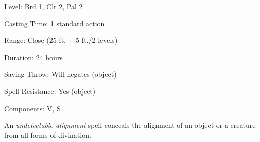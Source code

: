 
\begin{description*}
\item[Level:] Brd 1, Clr 2, Pal 2
\item[Casting Time:] 1 standard action
\item[Range:] Close (25 ft. + 5 ft./2 levels)
\item[Duration:] 24 hours
\item[Saving Throw:] Will negates (object)
\item[Spell Resistance:] Yes (object)
\item[Components:] V, S
\end{description*}

An \textit{undetectable alignment} spell conceals the alignment of an object or
a creature from all forms of divination.
